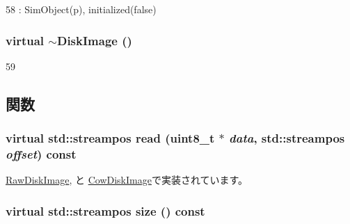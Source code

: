 \begin{DoxyCode}
58 : SimObject(p), initialized(false) {}
\end{DoxyCode}
\hypertarget{classDiskImage_a683bb9b788e4d03b2d080fddc83665b5}{
\subsubsection[{$\sim$DiskImage}]{\setlength{\rightskip}{0pt plus 5cm}virtual $\sim${\bf DiskImage} ()}}
\label{classDiskImage_a683bb9b788e4d03b2d080fddc83665b5}



\begin{DoxyCode}
59 {}
\end{DoxyCode}


\subsection{関数}
\hypertarget{classDiskImage_afcf02c1fffcb16ed79ac38bb87fb572c}{
\subsubsection[{read}]{\setlength{\rightskip}{0pt plus 5cm}virtual std::streampos read (uint8\_\-t $\ast$ {\em data}, \/  std::streampos {\em offset}) const}}
\label{classDiskImage_afcf02c1fffcb16ed79ac38bb87fb572c}


\hyperlink{classRawDiskImage_ab2e0b5adfb9d2c78b1e534efa2af6e45}{RawDiskImage}, と \hyperlink{classCowDiskImage_ab2e0b5adfb9d2c78b1e534efa2af6e45}{CowDiskImage}で実装されています。\hypertarget{classDiskImage_a0e772d58951a6696fce770bd4c390e9f}{
\subsubsection[{size}]{\setlength{\rightskip}{0pt plus 5cm}virtual std::streampos size () const}}
\label{classDiskImage_a0e772d58951a6696fce770bd4c390e9f}


